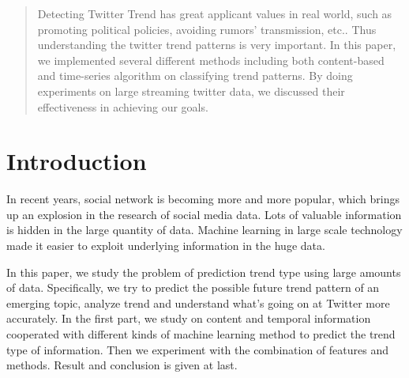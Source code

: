 \documentclass{article}
\begin{document}
 


\begin{abstract} 
Detecting Twitter Trend has great applicant values in real world, such as promoting political policies, avoiding rumors' transmission, etc.. Thus understanding the twitter trend patterns is very important. In this paper, we implemented several different methods including both content-based and time-series algorithm on classifying trend patterns. By doing experiments on large streaming twitter data, we discussed their effectiveness in achieving our goals.
\end{abstract} 

\section{Introduction}
In recent years, social network is becoming more and more popular, which brings up an explosion in the research of social media data. Lots of valuable information is hidden in the large quantity of data. Machine learning in large scale technology made it easier to exploit underlying information in the huge data.

In this paper, we study the problem of prediction trend type using large amounts of data. Specifically, we try to predict the possible future trend pattern of an emerging topic, analyze trend and understand what's going on at Twitter more accurately. In the first part, we study on content and temporal information cooperated with different kinds of machine learning method to predict the trend type of information. Then we experiment with the combination of features and methods. Result and conclusion is given at last.
\label{submission}
\end{document}
